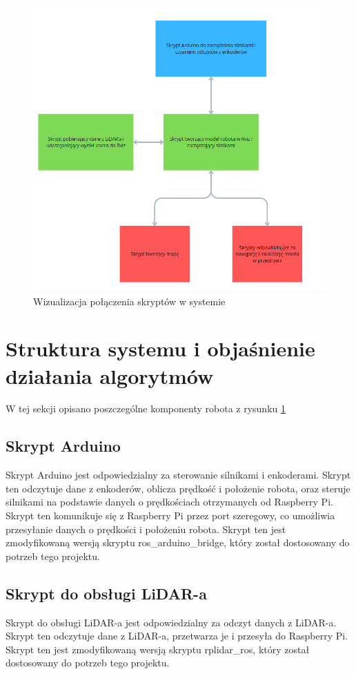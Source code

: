 \documentclass[a4paper,twoside,12pt]{book}
\begin{document}
\begin{figure}[!hb]
	\centering
	\includegraphics[width=1\textwidth]{images/diagram-programy.png}
	\caption{Wizualizacja połączenia skryptów w systemie}
	\label{fig:diagram-programy}
\end{figure}


\newpage
\section{Struktura systemu i objaśnienie działania algorytmów}
W tej sekcji opisano poszczególne komponenty robota z rysunku \ref{fig:diagram-programy}

\subsection{Skrypt Arduino}
Skrypt Arduino jest odpowiedzialny za sterowanie silnikami i enkoderami. Skrypt ten odczytuje dane z enkoderów, oblicza prędkość i położenie robota, oraz steruje silnikami na podstawie danych o prędkościach otrzymanych od Raspberry Pi. Skrypt ten komunikuje się z Raspberry Pi przez port szeregowy, co umożliwia przesyłanie danych o prędkości i położeniu robota.
Skrypt ten jest zmodyfikowaną wersją skryptu ros\_arduino\_bridge\cite{bib:rosarduinobridge}, który został dostosowany do potrzeb tego projektu.
\subsection{Skrypt do obsługi LiDAR-a}
Skrypt do obsługi LiDAR-a jest odpowiedzialny za odczyt danych z LiDAR-a. Skrypt ten odczytuje dane z LiDAR-a, przetwarza je i przesyła do Raspberry Pi. Skrypt ten jest zmodyfikowaną wersją skryptu rplidar\_ros\cite{bib:rplidarros}, który został dostosowany do potrzeb tego projektu.
\end{document}
